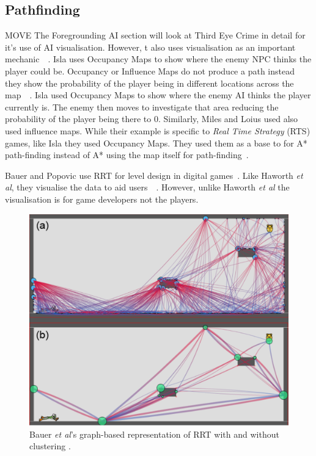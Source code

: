 \documentclass[journal]{IEEEtran}
\begin{document}
\subsection{Pathfinding}
MOVE
The Foregrounding AI section will look at Third Eye Crime in detail for it's use of AI visualisation. However, t also uses visualisation as an important mechanic~\cite{Isla2014}~\cite{game:ThirdEyeCrime}.  Isla uses Occupancy Maps to show where the enemy NPC thinks the player could be. Occupancy or Influence Maps do not produce a path instead they show the probability of the player being in different locations across the map~\cite{Isla2014}~\cite{Miles2006}. Isla used Occupancy Maps to show where the enemy AI thinks the player currently is. The enemy then moves to investigate that area reducing the probability of the player being there to 0.  Similarly, Miles and Loius used also used influence maps. While their example is specific to \textit{Real Time Strategy} (RTS) games, like Isla they used Occupancy Maps.  They used them as a base to for A* path-finding instead of A* using the map itself for path-finding~\cite{Miles2006}.

Bauer and Popovic use RRT for level design in digital games~\cite{bauer2012}. Like Haworth \textit{et al}, they visualise the data to aid users~\cite{bauer2012}~\cite{Haworth2010}. However, unlike Haworth \textit{et al} the visualisation is for game developers not the players. 

\begin{figure}[h]
	\includegraphics[width=1.0\linewidth]{BauerRRT.png}
	\caption{ Bauer \textit{et al}'s graph-based representation of RRT with and without clustering \cite{bauer2012}.}
	\label{BauerRRT}
\end{figure} 
\end{document}
